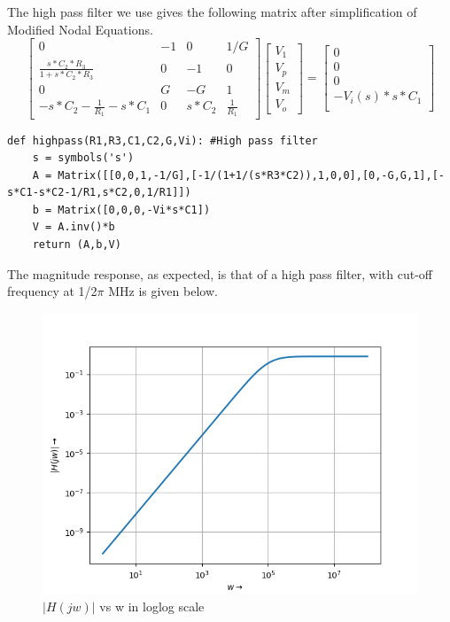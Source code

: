 \documentclass[11pt, a4paper]{article}
\begin{document}
The high pass filter we use gives the following matrix after simplification of Modified Nodal Equations.
\newline
\[
\begin{bmatrix}
    0   & -1 & 0  & 1/G \\
    \frac{s*C_2*R_3}{1+s*C_2*R_3}  & 0 & -1 & 0\\
    0  & G & -G & 1 \\
    -s*C_2 - \frac{1}{R_1} - s*C_1 & 0 & s*C_2 & \frac{1}{R_1}
\end{bmatrix}
\begin{bmatrix}
    V_1\\
    V_p\\
    V_m \\
    V_o
\end{bmatrix}
=
\begin{bmatrix}
    0 \\
    0 \\
    0 \\
    -V_i(s)*s*C_1 \\
    
\end{bmatrix}\]
\begin{verbatim}
def highpass(R1,R3,C1,C2,G,Vi): #High pass filter 
    s = symbols('s')
    A = Matrix([[0,0,1,-1/G],[-1/(1+1/(s*R3*C2)),1,0,0],[0,-G,G,1],[-s*C1-s*C2-1/R1,s*C2,0,1/R1]])
    b = Matrix([0,0,0,-Vi*s*C1])
    V = A.inv()*b
    return (A,b,V)
\end{verbatim}
The magnitude response, as expected, is that of a high pass filter, with
cut-off frequency at 1/2$\pi$ MHz is given below.
\begin{figure}[!tbh]
   	\centering
   	\includegraphics[scale=0.5]{fig2.png}  %
   	\caption{$|H(jw)|$ vs w in loglog scale}
   	\label{fig:sample}
   \end{figure}
\end{document}
